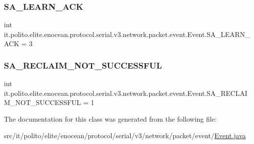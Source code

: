 \subsubsection{\texorpdfstring{S\+A\+\_\+\+L\+E\+A\+R\+N\+\_\+\+A\+CK}{SA\_LEARN\_ACK}}
{\footnotesize\ttfamily int it.\+polito.\+elite.\+enocean.\+protocol.\+serial.\+v3.\+network.\+packet.\+event.\+Event.\+S\+A\+\_\+\+L\+E\+A\+R\+N\+\_\+\+A\+CK = 3\hspace{0.3cm}{\ttfamily [static]}}

\hypertarget{classit_1_1polito_1_1elite_1_1enocean_1_1protocol_1_1serial_1_1v3_1_1network_1_1packet_1_1event_1_1_event_a3404ff630833b2a03f45167dce1f94f1}{}\label{classit_1_1polito_1_1elite_1_1enocean_1_1protocol_1_1serial_1_1v3_1_1network_1_1packet_1_1event_1_1_event_a3404ff630833b2a03f45167dce1f94f1} 
\subsubsection{\texorpdfstring{S\+A\+\_\+\+R\+E\+C\+L\+A\+I\+M\+\_\+\+N\+O\+T\+\_\+\+S\+U\+C\+C\+E\+S\+S\+F\+UL}{SA\_RECLAIM\_NOT\_SUCCESSFUL}}
{\footnotesize\ttfamily int it.\+polito.\+elite.\+enocean.\+protocol.\+serial.\+v3.\+network.\+packet.\+event.\+Event.\+S\+A\+\_\+\+R\+E\+C\+L\+A\+I\+M\+\_\+\+N\+O\+T\+\_\+\+S\+U\+C\+C\+E\+S\+S\+F\+UL = 1\hspace{0.3cm}{\ttfamily [static]}}



The documentation for this class was generated from the following file\+:\begin{DoxyCompactItemize}
\item 
src/it/polito/elite/enocean/protocol/serial/v3/network/packet/event/\hyperlink{it_2polito_2elite_2enocean_2protocol_2serial_2v3_2network_2packet_2event_2_event_8java}{Event.\+java}\end{DoxyCompactItemize}
